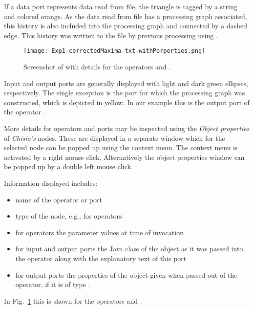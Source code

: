 If a data port represents data read from file,
the triangle is tagged by a string and colored orange.
As the data read from file 
has a processing graph associated,
this history is also included into the processing graph and 
connected by a dashed edge.
This history was written to the file  by previous
processing using \alida.


\begin{figure}
\begin{center}
{\texttt{[image: Exp1-correctedMaxima-txt-withPorperties.png]}}
\caption{\label{fig:exa1}Screenshot of \mtbc with details for the operators
 and .
}
\end{center}
\end{figure}


Input and output ports are generally displayed with light and 
dark green ellipses, respectively. 
The single exception
is the port for which the processing graph was constructed, which is depicted in
yellow.
In our example this is the output port  of the
operator .

More details for operators and ports may be inspected using the \textit{Object properties}
of {\em Chisio's} nodes.
These are displayed in a separate window which
for the selected node can be popped up using the context menu.
The context menu is activated by a right mouse click.
Alternatively the object properties window can be popped up by a double left mouse click.

Information displayed includes:
\begin{itemize}
\item	name of the operator or port
\item	type of the node, e.g.,  for operators
\item	for operators the parameter values at time of invocation
\item	for input and output ports the Java class of the object as it was passed
into the operator along with the explanatory text of this port
\item	for output ports the properties of the object
	given when passed out of the operator, if it is of type .
\end{itemize}
In Fig.~\ref{fig:exa1} this is shown for the operators
 and .



